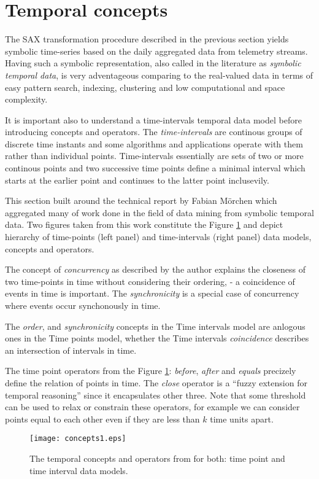 \section{Temporal concepts} \label{tconcepts}
The SAX transformation procedure described in the previous section yields symbolic time-series based on the daily aggregated data from telemetry streams. Having such a symbolic representation, also called in the literature as \textit{symbolic temporal data}, is very adventageous comparing to the real-valued data in terms of easy pattern search, indexing, clustering and low computational and space complexity. 

It is important also to understand a time-intervals temporal data model before introducing concepts and operators. The \textit{time-intervals} are continous groups of discrete time instants and some algorithms and applications operate with them rather than individual points. Time-intervals essentially are sets of two or more continous points and two successive time points define a minimal interval which starts at the earlier point and continues to the latter point inclusevily.

This section built around the technical report by Fabian M\"orchen \cite{citeulike:1748833} which aggregated many of work done in the field of data mining from symbolic temporal data. Two figures taken from this work constitute the Figure \ref{fig:concepts1} and depict hierarchy of time-points (left panel) and time-intervals (right panel) data models, concepts and operators.

The concept of \textit{concurrency} as described by the author explains the closeness of two time-points in time without considering their ordering, - a coincidence of events in time is important. The \textit{synchronicity} is a special case of concurrency where events occur synchonously in time.

The \textit{order}, and \textit{synchronicity} concepts in the Time intervals model are anlogous ones in the Time points model, whether the Time intervals \textit{coincidence} describes an intersection of intervals in time.

The time point operators from the Figure \ref{fig:concepts1}: \textit{before}, \textit{after} and \textit{equals} precizely define the relation of points in time. The \textit{close} operator is a ``fuzzy extension for temporal reasoning'' since it encapsulates other three. Note that some threshold can be used to relax or constrain these operators, for example we can consider points equal to each other even if they are less than $k$ time units apart.


\begin{figure}[tbp]
   \centering
   \texttt{[image: concepts1.eps]}
   \caption{The temporal concepts and operators from \cite{citeulike:1748833} for both: time point and time interval data models.}
   \label{fig:concepts1}
\end{figure}